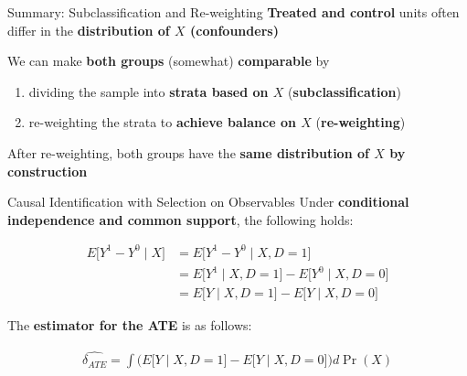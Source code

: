 \documentclass[
  ignorenonframetext,
  aspectratio=169, handout]{beamer}
\providecommand{\tightlist}{%
  \setlength{\itemsep}{0pt}\setlength{\parskip}{0pt}}
\newcommand{\brf}[1]{\textcolor{brickred}{\textbf{#1}}}
\begin{document}
\begin{frame}{Summary: Subclassification and Re-weighting}
\protect\hypertarget{summary-subclassification-and-re-weighting}{}
\brf{Treated and control} units often differ in the
\brf{distribution of $X$ (confounders)}

\vfill

We can make \textbf{both groups} (somewhat) \textbf{comparable} by

\begin{enumerate}
\tightlist
\item
  dividing the sample into \textbf{strata based on \(X\)}
  (\brf{subclassification})
\item
  re-weighting the strata to \textbf{achieve balance on \(X\)}
  (\brf{re-weighting})
\end{enumerate}

\vfill

After re-weighting, both groups have the \textbf{same distribution of
\(X\) by construction}
\end{frame}

\begin{frame}{Causal Identification with Selection on Observables}
\protect\hypertarget{causal-identification-with-selection-on-observables}{}
Under \brf{conditional independence and common support}, the following
holds:

\begin{align*}
   E\big[Y^1-Y^0\mid X\big] & = E\big[Y^1 - Y^0 \mid X,D=1\big]                     
   \\
            & = E\big[Y^1\mid X,D=1\big] - E\big[Y^0\mid X,D=0\big]
   \\
            & = E\big[Y\mid X,D=1\big] - E\big[Y\mid X,D=0\big]     
\end{align*}

\vfill

The \brf{estimator for the ATE} is as follows:

\begin{align*}
   \widehat{\delta_{ATE}}= \int \Big(E\big[Y\mid X,D=1\big] - E\big[Y\mid X,D=0\big]\Big)d\Pr(X)
\end{align*}
\end{frame}
\end{document}
